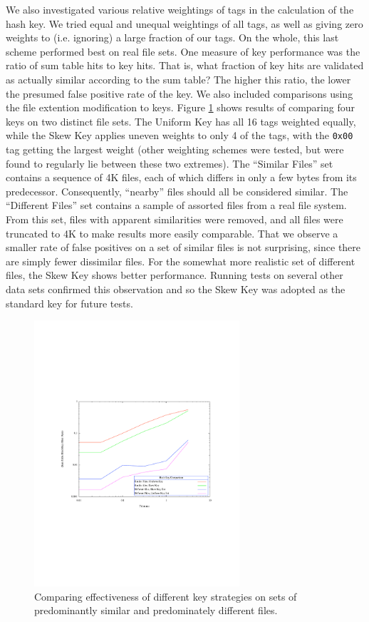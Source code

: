 \documentclass[10pt, twocolumn]{article}
\begin{document}
We also investigated various relative weightings of tags in the calculation of the hash key.  We tried equal and unequal weightings of all tags, as well as giving zero weights to (i.e. ignoring) a large fraction of our tags.  On the whole, this last scheme performed best on real file sets. One measure of key performance was the ratio of  sum table hits to key hits.  That is, what fraction of key hits are validated as actually similar according to the sum table?  The higher this ratio, the lower the presumed false positive rate of the key.  We also included comparisons using the file extention modification to keys.  Figure \ref{simdiff} shows results of comparing four keys on two distinct file sets.  The Uniform Key has all 16 tags weighted equally, while the Skew Key applies uneven weights to only 4 of the tags, with the {\tt 0x00} tag getting the largest weight (other weighting schemes were tested, but were found to regularly lie between these two extremes).  The ``Similar Files'' set contains a sequence of 4K files, each of which differs in only a few bytes from its predecessor.  Consequently, ``nearby'' files should all be considered similar.  The ``Different Files'' set contains a sample of assorted files from a real file system.  From this set, files with apparent similarities were removed, and all files were truncated to 4K to make results more easily comparable.  That we observe a smaller rate of false positives on a set of similar files is not surprising, since there are simply fewer dissimilar files.  For the somewhat more realistic set of different files, the Skew Key shows better performance.  Running tests on several other data sets confirmed this observation and so the Skew Key was adopted as the standard key for future tests.

 \begin{figure}[t] 
 \centering
\includegraphics[width= 3in]{ratioSimDiff.pdf}
\caption{Comparing effectiveness of different key strategies on sets of predominantly similar and predominately different files.}
\label{simdiff} 
\end{figure}   
\end{document}
